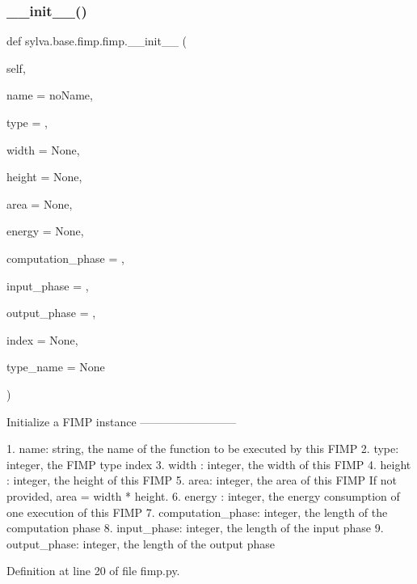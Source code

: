 \subsubsection{\texorpdfstring{\+\_\+\+\_\+init\+\_\+\+\_\+()}{\_\_init\_\_()}}
{\footnotesize\ttfamily def sylva.\+base.\+fimp.\+fimp.\+\_\+\+\_\+init\+\_\+\+\_\+ (\begin{DoxyParamCaption}\item[{}]{self,  }\item[{}]{name = {\ttfamily \textquotesingle{}noName\textquotesingle{}},  }\item[{}]{type = {},  }\item[{}]{width = {\ttfamily None},  }\item[{}]{height = {\ttfamily None},  }\item[{}]{area = {\ttfamily None},  }\item[{}]{energy = {\ttfamily None},  }\item[{}]{computation\+\_\+phase = {},  }\item[{}]{input\+\_\+phase = {},  }\item[{}]{output\+\_\+phase = {},  }\item[{}]{index = {\ttfamily None},  }\item[{}]{type\+\_\+name = {\ttfamily None} }\end{DoxyParamCaption})}

\begin{DoxyVerb}  Initialize a FIMP instance
  --------------------------

  1. name: string, the name of the function to be executed by this FIMP
  2. type: integer, the FIMP type index
  3. width : integer, the width of this FIMP
  4. height : integer, the height of this FIMP
  5. area: integer, the area of this FIMP
    If not provided, area = width * height.
  6. energy : integer, the energy consumption of one execution of this FIMP
  7. computation_phase: integer, the length of the computation phase
  8. input_phase: integer, the length of the input phase
  9. output_phase: integer, the length of the output phase
\end{DoxyVerb}
 

Definition at line 20 of file fimp.\+py.


